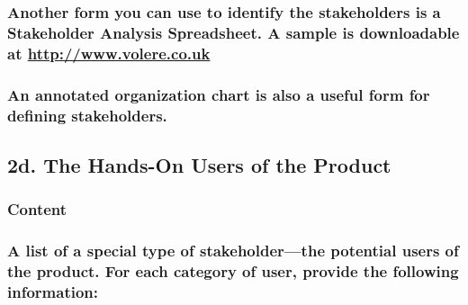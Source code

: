 \documentclass[
]{article}
\begin{document}
\hypertarget{another-form-you-can-use-to-identify-the-stakeholders-is-a-stakeholder-analysis-spreadsheet.-a-sample-is-downloadable-at-httpwww.volere.co.uk}{%
\subsubsection{\texorpdfstring{Another form you can use to identify the
stakeholders is a Stakeholder Analysis Spreadsheet. A sample is
downloadable at
\href{http://www.volere.co.uk/}{http://www.volere.co.uk}}{Another form you can use to identify the stakeholders is a Stakeholder Analysis Spreadsheet. A sample is downloadable at http://www.volere.co.uk}}\label{another-form-you-can-use-to-identify-the-stakeholders-is-a-stakeholder-analysis-spreadsheet.-a-sample-is-downloadable-at-httpwww.volere.co.uk}}

\hypertarget{an-annotated-organization-chart-is-also-a-useful-form-for-defining-stakeholders.}{%
\subsubsection{An annotated organization chart is also a useful form for
defining
stakeholders.}\label{an-annotated-organization-chart-is-also-a-useful-form-for-defining-stakeholders.}}

\hypertarget{d.-the-hands-on-users-of-the-product}{%
\subsection{\texorpdfstring{2d. The Hands-On Users of the Product
}{2d. The Hands-On Users of the Product }}\label{d.-the-hands-on-users-of-the-product}}

\hypertarget{content-5}{%
\subsubsection{Content}\label{content-5}}

\hypertarget{a-list-of-a-special-type-of-stakeholderthe-potential-users-of-the-product.-for-each-category-of-user-provide-the-following-information}{%
\subsubsection{\texorpdfstring{A list of a special type of
stakeholder---the potential users of the product. For each category of
user, provide the following information:
}{A list of a special type of stakeholder---the potential users of the product. For each category of user, provide the following information: }}\label{a-list-of-a-special-type-of-stakeholderthe-potential-users-of-the-product.-for-each-category-of-user-provide-the-following-information}}
\end{document}
